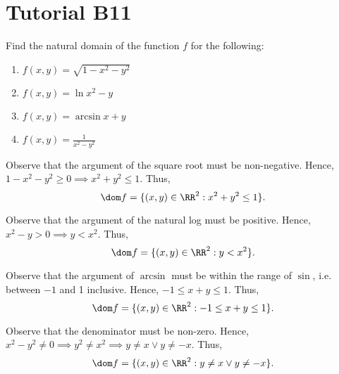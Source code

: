 \section{Tutorial B11}

\begin{problem}
    Find the natural domain of the function $f$ for the following:
    \begin{enumerate}
        \item $f(x, y) = \sqrt{1 - x^2 - y^2}$
        \item $f(x, y) = \ln{x^2 - y}$
        \item $f(x, y) = \arcsin{x + y}$
        \item $f(x, y) = \frac1{x^2 - y^2}$
    \end{enumerate}
\end{problem}
\begin{solution}
    \begin{ppart}
        Observe that the argument of the square root must be non-negative. Hence, $1 - x^2 - y^2 \geq 0 \implies x^2 + y^2 \leq 1$. Thus, \[\dom f = \{ (x, y) \in \RR^2 : x^2 + y^2 \leq 1\}.\]
    \end{ppart}
    \begin{ppart}
        Observe that the argument of the natural log must be positive. Hence, $x^2 - y > 0 \implies y < x^2$. Thus, \[\dom f = \{(x, y) \in \RR^2 : y < x^2\}.\]
    \end{ppart}
    \begin{ppart}
        Observe that the argument of $\arcsin$ must be within the range of $\sin$, i.e. between $-1$ and 1 inclusive. Hence, $-1 \leq x + y \leq 1$. Thus, \[\dom f = \{(x, y) \in \RR^2 : -1 \leq x + y \leq 1\}.\]
    \end{ppart}
    \begin{ppart}
        Observe that the denominator must be non-zero. Hence, $x^2 - y^2 \neq 0 \implies y^2 \neq x^2 \implies y \neq x \lor y \neq -x$. Thus, \[\dom f = \{(x, y) \in \RR^2 : y \neq x \lor y \neq -x\}.\]
    \end{ppart}
\end{solution}

